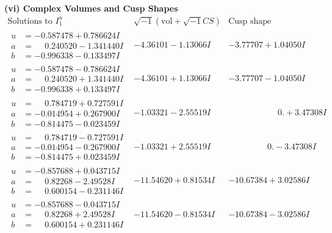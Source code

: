 \documentclass[1p]{elsarticle_modified}
\theoremstyle{definition}
\newcommand{\I}{\sqrt{-1}}
\begin{document}
\newpage\flushleft \textbf{(vi) Complex Volumes and Cusp Shapes}
$$\begin{array}{c|c|c}  
\text{Solutions to }I^u_{1}& \I (\text{vol} + \sqrt{-1}CS) & \text{Cusp shape}\\
 \hline 
\begin{aligned}
u &= -0.587478 + 0.786624 I \\
a &= \phantom{-}0.240520 - 1.341440 I \\
b &= -0.996338 - 0.133497 I\end{aligned}
 & -4.36101 - 1.13066 I & -3.77707 + 1.04050 I \\ \hline\begin{aligned}
u &= -0.587478 - 0.786624 I \\
a &= \phantom{-}0.240520 + 1.341440 I \\
b &= -0.996338 + 0.133497 I\end{aligned}
 & -4.36101 + 1.13066 I & -3.77707 - 1.04050 I \\ \hline\begin{aligned}
u &= \phantom{-}0.784719 + 0.727591 I \\
a &= -0.014954 + 0.267900 I \\
b &= -0.814475 - 0.023459 I\end{aligned}
 & -1.03321 - 2.55519 I & \phantom{-0.000000 -}0. + 3.47308 I \\ \hline\begin{aligned}
u &= \phantom{-}0.784719 - 0.727591 I \\
a &= -0.014954 - 0.267900 I \\
b &= -0.814475 + 0.023459 I\end{aligned}
 & -1.03321 + 2.55519 I & \phantom{-0.000000 } 0. - 3.47308 I \\ \hline\begin{aligned}
u &= -0.857688 + 0.043715 I \\
a &= \phantom{-}0.82268 - 2.49528 I \\
b &= \phantom{-}0.600154 - 0.231146 I\end{aligned}
 & -11.54620 + 0.81534 I & -10.67384 + 3.02586 I \\ \hline\begin{aligned}
u &= -0.857688 - 0.043715 I \\
a &= \phantom{-}0.82268 + 2.49528 I \\
b &= \phantom{-}0.600154 + 0.231146 I\end{aligned}
 & -11.54620 - 0.81534 I & -10.67384 - 3.02586 I \\ \hline\begin{aligned}

\end{aligned}
\end{array}$$
\end{document}
